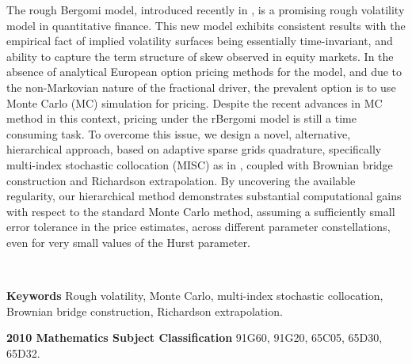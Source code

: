 
The rough Bergomi model, introduced recently in  \cite{bayer2016pricing}, is a promising rough volatility model in quantitative finance. This new model exhibits consistent results with the empirical fact of implied volatility surfaces being essentially time-invariant, and  ability to capture the term structure of skew observed in equity markets. In the absence of analytical European option pricing methods for the model, and due to the non-Markovian nature of the fractional driver, the prevalent option is to use Monte Carlo (MC) simulation for pricing. Despite the recent advances in MC method in this context, pricing under the rBergomi model is still a time consuming task. To overcome this issue, we design a novel,  alternative, hierarchical approach, based on adaptive sparse grids quadrature, specifically  multi-index stochastic collocation (MISC) as in  \cite{haji2016multi}, coupled with Brownian bridge construction and Richardson extrapolation. By uncovering the available regularity,  our hierarchical method demonstrates substantial computational gains with respect to the standard Monte Carlo method, assuming a sufficiently small error tolerance in the price estimates, across different parameter constellations, even for very small values of the Hurst  parameter.

\

\textbf{Keywords} Rough volatility, Monte Carlo, multi-index stochastic collocation, Brownian bridge construction, Richardson extrapolation.

\textbf{2010 Mathematics Subject Classification} 	91G60, 	91G20, 65C05, 65D30, 65D32.